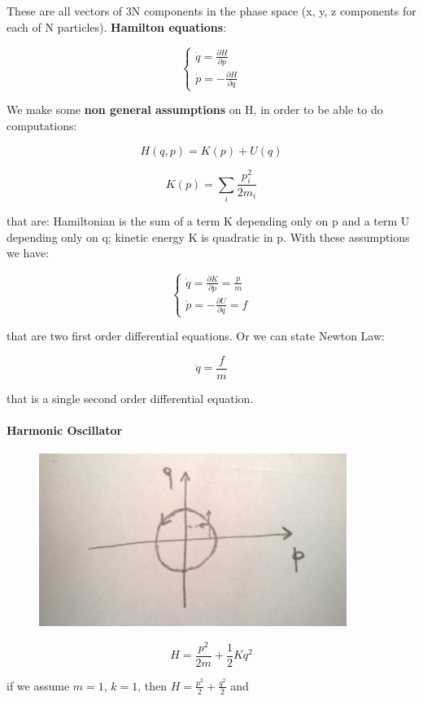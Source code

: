 \documentclass[a4paper, italian, openany]{book}
\begin{document}
These are all vectors of 3N components in the phase space (x, y, z components for each of N particles). \textbf{Hamilton equations}:

$$\begin{cases}
\dot{q} = \frac{\partial H }{\partial p} \\
\dot{p} = - \frac{\partial H}{\partial q}
\end{cases}$$

We make some \textbf{non general assumptions} on H, in order to be able to do computations:

$$H(q, p) = K(p) + U(q)$$

$$K(p) = \sum_i \frac{p_i^2}{2m_i}$$

that are: Hamiltonian is the sum of a term K depending only on p and a term U depending only on q; kinetic energy K is quadratic in p. With these assumptions we have:

$$\begin{cases}
\dot{q} = \frac{\partial K }{\partial p} = \frac{p}{m}\\
\dot{p} = - \frac{\partial U}{\partial q} = f
\end{cases}$$

that are two first order differential equations. Or we can state Newton Law:

$$\ddot{q} = \frac{f}{m}$$

that is a single second order differential equation.

\paragraph{Harmonic Oscillator}

\begin{figure}[H]
\centering
\includegraphics[width=100mm]{img/pic1.jpg}
\end{figure}

$$H = \frac{p^2}{2m} + \frac{1}{2} K q^2$$

if we assume $m=1$, $k=1$, then $H=\frac{p^2}{2} + \frac{q^2}{2}$ and
\end{document}

